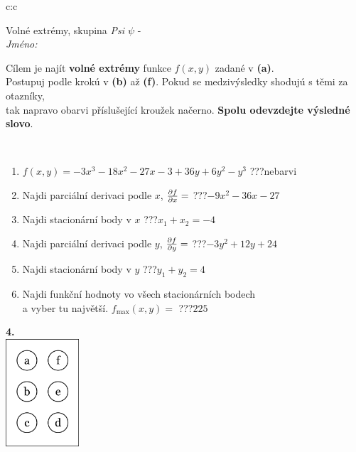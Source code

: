 \documentclass[10pt]{report}
\begin{document}
\begin{tabular}{c:c}
\begin{minipage}[c][104.5mm][t]{0.5\linewidth}
\begin{center}
\vspace{7mm}
{\huge Volné extrémy, skupina \textit{Psi $\psi$} -}\\[5mm]
\textit{Jméno:}\phantom{xxxxxxxxxxxxxxxxxxxxxxxxxxxxxxxxxxxxxxxxxxxxxxxxxxxxxxxxxxxxxxxxx}\\[5mm]
\begin{minipage}{0.95\linewidth}
\begin{center}
Cílem je najít \textbf{volné extrémy} funkce $f(x,y)$ zadané v \textbf{(a)}.\\Postupuj podle krokú v \textbf{(b)} až \textbf{(f)}. Pokud se medzivýsledky shodujú s těmi za otazníky,\\tak napravo obarvi příslušející kroužek načerno. \textbf{Spolu odevzdejte výsledné slovo}.
\end{center}
\end{minipage}
\\[1mm]
\begin{minipage}{0.79\linewidth}
\begin{center}
\begin{varwidth}{\linewidth}
\begin{enumerate}
\normalsize
\item $f(x,y)=-3x^3-18x^2-27x-3+36y+6y^2-y^3$\quad \dotfill\; ???\;\dotfill \quad nebarvi
\item Najdi parciální derivaci podle $x$, $\pdv{f}{x}=$\quad \dotfill\; ???\;\dotfill \quad $-9x^2-36x-27$
\item Najdi stacionární body v $x$\quad \dotfill\; ???\;\dotfill \quad $x_1+x_2=-4$
\item Najdi parciální derivaci podle $y$, $\pdv{f}{y}=$\quad \dotfill\; ???\;\dotfill \quad $-3y^2+12y+24$
\item Najdi stacionární body v $y$\quad \dotfill\; ???\;\dotfill \quad $y_1+y_2=4$
\item Najdi funkční hodnoty vo všech stacionárních bodech \\ \phantom{xxxxxx} a vyber tu najvětší. $f_{\text{max}}(x,y)=$\quad \dotfill\; ???\;\dotfill \quad $225$
\end{enumerate}
\end{varwidth}
\end{center}
\end{minipage}
\begin{minipage}{0.20\linewidth}
\begin{center}
{\Huge\bfseries 4.} \\[2mm]
\includegraphics[height=40mm]{../images/braille.png}

\end{center}
\end{minipage}
\end{center}
\end{minipage}
\end{tabular}
\end{document}
